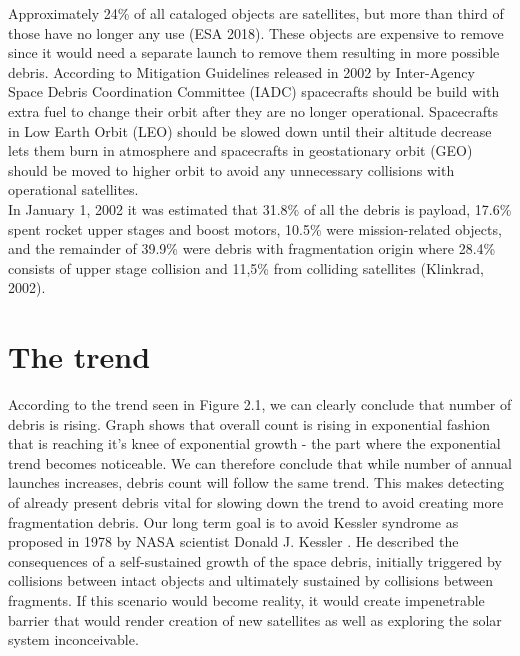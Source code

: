 \documentclass[12pt, a4paper, oneside]{book}
\begin{document}
Approximately 24\% of all cataloged objects are satellites, but more than third of those have no longer any use (ESA 2018).
These objects are expensive to remove since it would need a separate launch to remove them resulting in more possible debris.
According to Mitigation Guidelines released in 2002 by Inter-Agency Space Debris Coordination Committee (IADC) spacecrafts should be build with extra fuel to change their orbit after they are no longer operational.
Spacecrafts in Low Earth Orbit (LEO) should be slowed down until their altitude decrease lets them burn in atmosphere and spacecrafts in geostationary orbit (GEO) should be moved to higher orbit to avoid any unnecessary collisions with operational satellites.\\
In January 1, 2002 it was estimated that 31.8\% of all the debris is payload, 17.6\% spent rocket upper stages and boost motors, 10.5\% were mission-related objects, and the remainder of 39.9\% were debris with fragmentation origin where 28.4\% consists of upper stage collision and 11,5\% from colliding satellites (Klinkrad, 2002).

\section{The trend}


According to the trend seen in Figure 2.1, we can clearly conclude that number of debris is rising.
Graph shows that overall count is rising in exponential fashion that is reaching it's knee of exponential growth - the part where the exponential trend becomes noticeable.
We can therefore conclude that while number of annual launches increases, debris count will follow the same trend.
This makes detecting of already present debris vital for slowing down the trend to avoid creating more fragmentation debris.
Our long term goal is to avoid Kessler syndrome as proposed in 1978 by NASA scientist Donald J. Kessler \cite{kessler}.
He described the consequences of a self-sustained growth of the space debris, initially triggered by collisions between intact objects and ultimately sustained by collisions between fragments.
If this scenario would become reality, it would create impenetrable barrier that would render creation of new satellites as well as exploring the solar system inconceivable.
\end{document}
